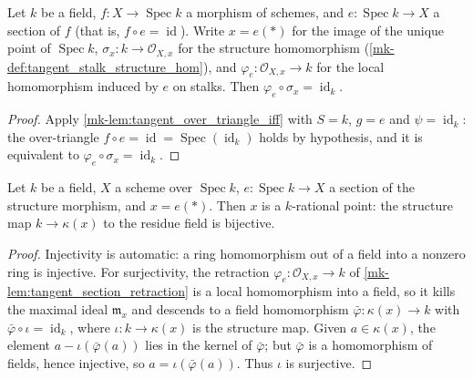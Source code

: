 \begin{lemma}\label{mk-lem:tangent_section_retraction}
  \leanok

  Let \(k\) be a field, \(f : X \to \operatorname{Spec} k\) a morphism
  of schemes, and \(e : \operatorname{Spec} k \to X\) a section of
  \(f\) (that is, \(f \circ e = \operatorname{id}\)). Write
  \(x = e(*)\) for the image of the unique point of
  \(\operatorname{Spec} k\), \(\sigma_x : k \to \mathcal O_{X,x}\) for
  the structure homomorphism
  (\ref{mk-def:tangent_stalk_structure_hom}), and
  \(\varphi_e : \mathcal O_{X,x} \to k\) for the local homomorphism
  induced by \(e\) on stalks. Then
  \(\varphi_e \circ \sigma_x = \operatorname{id}_k\).
\end{lemma}

\begin{proof}
  \leanok{}
  Apply \ref{mk-lem:tangent_over_triangle_iff} with \(S = k\),
  \(g = e\) and \(\psi = \operatorname{id}_k\): the over-triangle
  \(f \circ e = \operatorname{id} =
  \operatorname{Spec}(\operatorname{id}_k)\) holds by hypothesis, and
  it is equivalent to \(\varphi_e \circ \sigma_x =
  \operatorname{id}_k\).
\end{proof}

\begin{lemma}\label{mk-lem:tangent_section_rational}
  \leanok

  Let \(k\) be a field, \(X\) a scheme over \(\operatorname{Spec} k\),
  \(e : \operatorname{Spec} k \to X\) a section of the structure
  morphism, and \(x = e(*)\). Then \(x\) is a \(k\)-rational point:
  the structure map \(k \to \kappa(x)\) to the residue field is
  bijective.
\end{lemma}

\begin{proof}
  \leanok{}
  Injectivity is automatic: a ring homomorphism out of a field into a
  nonzero ring is injective. For surjectivity, the retraction
  \(\varphi_e : \mathcal O_{X,x} \to k\) of
  \ref{mk-lem:tangent_section_retraction} is a local homomorphism into
  a field, so it kills the maximal ideal \(\mathfrak m_x\) and
  descends to a field homomorphism
  \(\bar\varphi : \kappa(x) \to k\) with
  \(\bar\varphi \circ \iota = \operatorname{id}_k\), where
  \(\iota : k \to \kappa(x)\) is the structure map. Given
  \(a \in \kappa(x)\), the element
  \(a - \iota(\bar\varphi(a))\) lies in the kernel of
  \(\bar\varphi\); but \(\bar\varphi\) is a homomorphism of fields,
  hence injective, so \(a = \iota(\bar\varphi(a))\). Thus \(\iota\)
  is surjective.
\end{proof}

